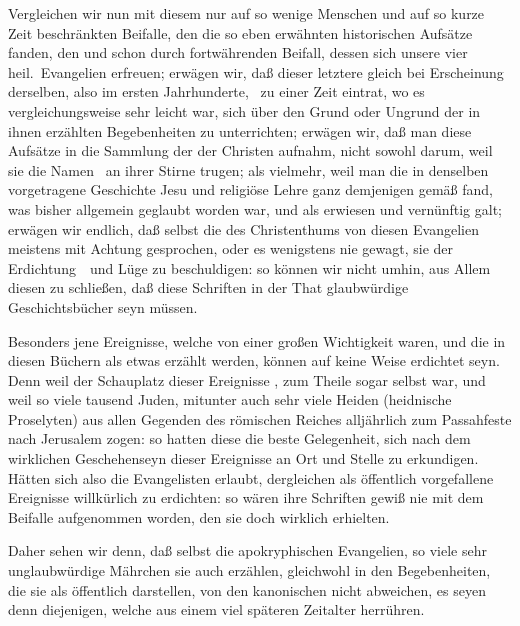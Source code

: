 \begin{aufza}
\item Vergleichen wir nun mit diesem nur auf so wenige Menschen und auf so kurze Zeit beschränkten Beifalle, den die so eben erwähnten historischen Aufsätze fanden, den  und schon durch  fortwährenden Beifall, dessen sich unsere vier heil.\ Evangelien erfreuen; erwägen wir, daß dieser letztere gleich bei Erscheinung derselben, also im ersten Jahrhunderte, \dh\ zu einer Zeit eintrat, wo es vergleichungsweise sehr leicht war, sich über den Grund oder Ungrund der in ihnen erzählten Begebenheiten zu unterrichten; erwägen wir, daß man diese Aufsätze in die Sammlung der  der Christen aufnahm, nicht sowohl darum, weil sie die Namen  \usw\ an ihrer Stirne trugen; als vielmehr, weil man die in denselben vorgetragene Geschichte Jesu und religiöse Lehre ganz demjenigen gemäß fand, was bisher allgemein geglaubt worden war, und als erwiesen und vernünftig galt; erwägen wir endlich, daß selbst die  des Christenthums von diesen Evangelien meistens mit Achtung gesprochen, oder es wenigstens nie gewagt, sie der Erdichtung~\ und Lüge zu beschuldigen:
so können wir nicht umhin, aus Allem diesen zu schließen, daß diese Schriften in der That glaubwürdige Geschichtsbücher seyn müssen.
\item Besonders jene Ereignisse, welche von einer großen Wichtigkeit waren, und die in diesen Büchern als etwas  erzählt werden, können auf keine Weise erdichtet seyn. Denn weil der Schauplatz dieser Ereignisse , zum Theile sogar  selbst war, und weil so viele tausend Juden, mitunter auch sehr viele Heiden (heidnische Proselyten) aus allen Gegenden des römischen Reiches alljährlich zum Passahfeste nach Jerusalem zogen: so hatten diese die beste Gelegenheit, sich nach dem wirklichen Geschehenseyn dieser Ereignisse an Ort und Stelle zu erkundigen. Hätten sich also die Evangelisten erlaubt, dergleichen als öffentlich vorgefallene Ereignisse willkürlich zu erdichten: so wären ihre Schriften gewiß nie mit dem Beifalle aufgenommen worden, den sie doch wirklich erhielten.
\end{aufza}
\begin{RWanm} 
Daher sehen wir denn, daß selbst die apokryphischen Evangelien, so viele sehr unglaubwürdige Mährchen sie auch erzählen, gleichwohl in den Begebenheiten, die sie als öffentlich darstellen, von den kanonischen nicht abweichen, es seyen denn diejenigen, welche aus einem viel späteren Zeitalter herrühren.
\end{RWanm}

